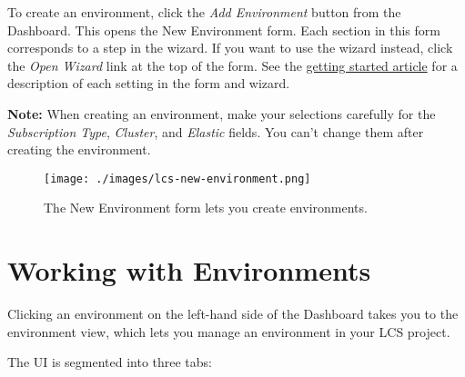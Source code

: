 To create an environment, click the \emph{Add Environment} button from
the Dashboard. This opens the New Environment form. Each section in this
form corresponds to a step in the wizard. If you want to use the wizard
instead, click the \emph{Open Wizard} link at the top of the form. See
the
\href{/docs/7-2/deploy/-/knowledge_base/d/getting-started-with-lcs}{getting
started article} for a description of each setting in the form and
wizard.

\noindent\hrulefill

\textbf{Note:} When creating an environment, make your selections
carefully for the \emph{Subscription Type}, \emph{Cluster}, and
\emph{Elastic} fields. You can't change them after creating the
environment.

\noindent\hrulefill

\begin{figure}
\centering
\texttt{[image: ./images/lcs-new-environment.png]}
\caption{The New Environment form lets you create environments.}
\end{figure}

\section{Working with Environments}\label{working-with-environments}

Clicking an environment on the left-hand side of the Dashboard takes you
to the environment view, which lets you manage an environment in your
LCS project.

The UI is segmented into three tabs:

